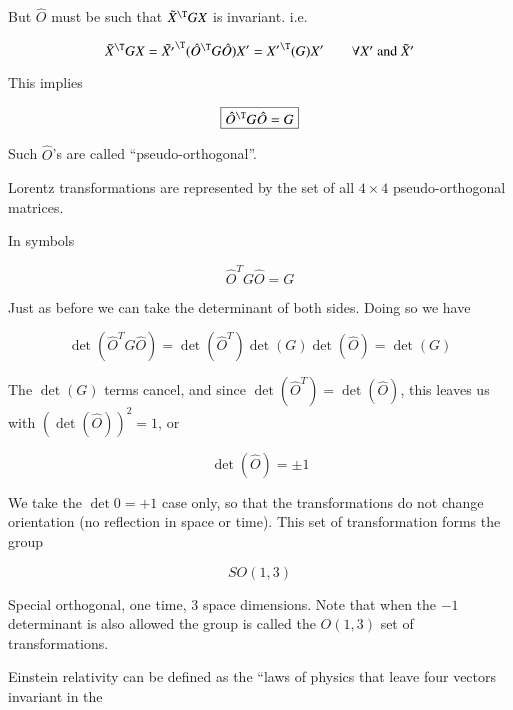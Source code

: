 But $\hat{O}$ must be such that $\tilde{X}^\T G X$ is invariant.  i.e.

\begin{equation}\label{eqn:relativisticElectrodynamicsL6:100}
\tilde{X}^\T G X = {\tilde{X'}}^\T (\hat{O}^\T G \hat{O}) X' = {X'}^\T (G) X' \qquad \mbox{$\forall X'$ and $\tilde{X}'$}
\end{equation}

This implies

\begin{equation}\label{eqn:relativisticElectrodynamicsL6:110}
\boxed{\hat{O}^\T G \hat{O} = G}
\end{equation}

Such $\hat{O}$'s are called ``pseudo-orthogonal''.

Lorentz transformations are represented by the set of all $4 \times 4$ pseudo-orthogonal matrices.

In symbols

\begin{equation}\label{eqn:relativisticElectrodynamicsL6:120}
\hat{O}^T G \hat{O} = G
\end{equation}

Just as before we can take the determinant of both sides.  Doing so we have

\begin{equation}\label{eqn:relativisticElectrodynamicsL6:130}
\det(\hat{O}^T G \hat{O}) = \det(\hat{O}^T) \det(G) \det(\hat{O}) = \det(G)
\end{equation}

The $\det(G)$ terms cancel, and since $\det(\hat{O}^T) = \det(\hat{O})$, this leaves us with $(\det(\hat{O}))^2 = 1$, or

\begin{equation}\label{eqn:relativisticElectrodynamicsL6:140}
\det(\hat{O}) = \pm 1
\end{equation}

We take the $\det 0 = +1$ case only, so that the transformations do not change orientation (no reflection in space or time).  This set of transformation forms the group

\begin{equation*}
SO(1,3)
\end{equation*}

Special orthogonal, one time, 3 space dimensions.  Note that when the $-1$ determinant is also allowed the group is called the $O(1,3)$ set of transformations.

Einstein relativity can be defined as the ``laws of physics that leave four vectors invariant in the

